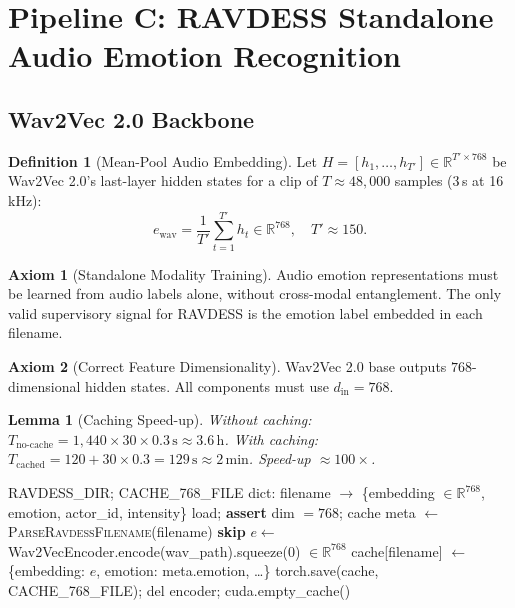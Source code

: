 \documentclass[12pt,a4paper]{article}
\theoremstyle{definition}
\newtheorem{definition}{Definition}[section]
\newtheorem{axiom}{Axiom}[section]
\theoremstyle{plain}
\newtheorem{lemma}[theorem]{Lemma}
\theoremstyle{remark}
\newcommand{\R}{\mathbb{R}}
\begin{document}
\newpage
\section{Pipeline C: RAVDESS Standalone Audio Emotion Recognition}
\label{sec:pipelineC}

\subsection{Wav2Vec 2.0 Backbone}

\begin{definition}[Mean-Pool Audio Embedding]
Let $H = [h_1,\ldots,h_{T'}] \in \R^{T' \times 768}$ be Wav2Vec 2.0's last-layer hidden states for a clip of $T \approx 48{,}000$ samples (3\,s at 16\,kHz):
\[
  e_{\text{wav}} = \frac{1}{T'}\sum_{t=1}^{T'} h_t \in \R^{768}, \quad T' \approx 150.
\]
\end{definition}

\begin{axiom}[Standalone Modality Training]
Audio emotion representations must be learned from audio labels alone, without cross-modal entanglement. The only valid supervisory signal for RAVDESS is the emotion label embedded in each filename.
\end{axiom}

\begin{axiom}[Correct Feature Dimensionality]
Wav2Vec 2.0 base outputs $768$-dimensional hidden states. All components must use $d_{\text{in}} = 768$.
\end{axiom}

\begin{lemma}[Caching Speed-up]
Without caching: $T_{\text{no-cache}} = 1{,}440 \times 30 \times 0.3\,\text{s} \approx 3.6\,\text{h}$.
With caching: $T_{\text{cached}} = 120 + 30 \times 0.3 = 129\,\text{s} \approx 2\,\text{min}$.
Speed-up $\approx 100\times$.
\end{lemma}

\begin{algorithm}[H]
\caption{Extract and Cache RAVDESS Embeddings at 768d}
\label{alg:cache_ravdess}
\begin{algorithmic}[1]
\Require RAVDESS\_DIR; CACHE\_768\_FILE
\Ensure dict: filename $\to$ \{embedding $\in \R^{768}$, emotion, actor\_id, intensity\}
 load; \textbf{assert} dim $= 768$; \Return cache \EndIf
{}
    \State meta $\gets$ \textsc{ParseRavdessFilename}(filename) 
     \textbf{skip} \EndIf
    \State $e \gets$ Wav2VecEncoder.encode(wav\_path).squeeze(0) \quad $\in \R^{768}$
    \State cache[filename] $\gets$ \{embedding: $e$, emotion: meta.emotion, \ldots\}
  \EndFor
\EndFor
\State torch.save(cache, CACHE\_768\_FILE); del encoder; cuda.empty\_cache()
\end{algorithmic}
\end{algorithm}
\end{document}
